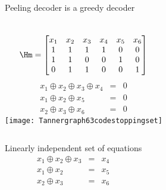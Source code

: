 \begin{frame}{Peeling decoder is a greedy decoder}
\vspace{-3mm}
\begin{columns}
\[
\Hm = \begin{bmatrix}
      x_1 & x_2 & x_3 & x_4 & x_5 & x_6 \\
      1 & 1 & 1 & 1 & 0 & 0 \\
      1 & 1 & 0 & 0 & 1 & 0 \\
      0 & 1 & 1 & 0 & 0 & 1 \\
    \end{bmatrix}
\]
\begin{eqnarray*}
  x_1 \oplus x_2 \oplus x_3 \oplus x_4 &=& 0 \\
  x_1 \oplus x_2 \oplus x_5 &=& 0 \\
  x_2 \oplus x_3 \oplus x_6 &=& 0
\end{eqnarray*}
\texttt{[image: Tannergraph63codestoppingset]}
\end{columns}
\pause
\vspace{-3mm}
\begin{columns}
\begin{block}{Linearly independent set of equations}
\begin{eqnarray*}
  x_1 \oplus x_2 \oplus x_3 & = & x_4 \\
  x_1 \oplus x_2  &=& x_5 \\
  x_2 \oplus x_3  &=& x_6
\end{eqnarray*}
\end{block}
\end{columns}
\end{frame}
